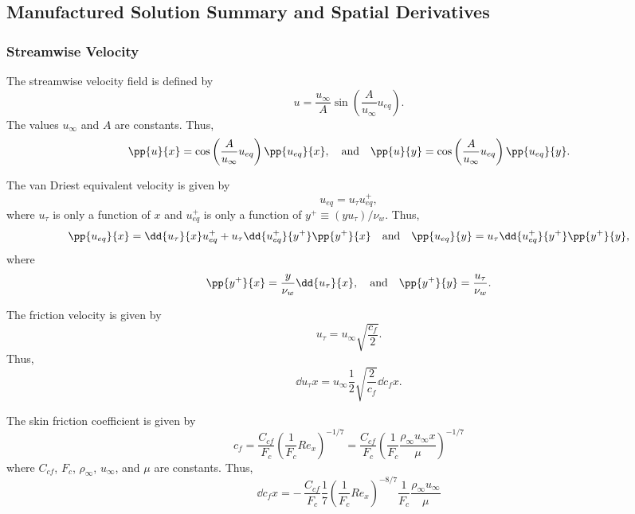 \subsection{Manufactured Solution Summary and Spatial Derivatives} \label{sec:summary_and_derivatives}

\subsubsection{Streamwise Velocity}
The streamwise velocity field is defined by
%
\begin{equation*}
u = \frac{u_{\infty}}{A} \sin \left( \frac{A}{u_{\infty}} u_{eq} \right).
\end{equation*}
%
The values $u_{\infty}$ and $A$ are constants.  Thus,
%
\begin{gather*}
\pp{u}{x} = \cos \left(\frac{A}{u_{\infty}} u_{eq} \right) \pp{u_{eq}}{x}, \quad \text{and} \quad
\pp{u}{y} = \cos \left(\frac{A}{u_{\infty}} u_{eq} \right) \pp{u_{eq}}{y}.
\end{gather*}
%

The van Driest equivalent velocity is given by
%
\begin{equation*}
u_{eq} = u_{\tau} u_{eq}^+,
\end{equation*}
% 
where $u_{\tau}$ is only a function of $x$ and $u_{eq}^+$ is only a
function of $y^+ \equiv (y u_{\tau})/\nu_w$.  Thus,
%
\begin{gather*}
\pp{u_{eq}}{x} = \dd{u_{\tau}}{x} u_{eq}^+ + u_{\tau} \dd{u_{eq}^+}{y^+} \pp{y^+}{x} \quad \text{and} \quad
\pp{u_{eq}}{y} =  u_{\tau} \dd{u_{eq}^+}{y^+} \pp{y^+}{y},
\end{gather*}
%
where
%
\begin{gather*}
\pp{y^+}{x} = \frac{y}{\nu_w} \dd{u_{\tau}}{x}, \quad \text{and} \quad
\pp{y^+}{y} = \frac{u_{\tau}}{\nu_w}.
\end{gather*}
%

The friction velocity is given by
%
\begin{equation*}
u_{\tau} = u_{\infty} \sqrt{\frac{c_f}{2}}.
\end{equation*}
%
Thus,
%
\begin{equation*}
\dd{u_{\tau}}{x} = u_{\infty}  \frac{1}{2} \sqrt{ \frac{2}{c_f} } \dd{c_f}{x}.
\end{equation*}
%

The skin friction coefficient is given by
%
\begin{equation*}
c_f = \frac{C_{cf}}{F_c} \left( \frac{1}{F_c} Re_x \right)^{-1/7} = \frac{C_{cf}}{F_c} \left( \frac{1}{F_c} \frac{\rho_{\infty} u_{\infty} x}{\mu} \right)^{-1/7}
\end{equation*}
%
where $C_{cf}$, $F_c$, $\rho_{\infty}$, $u_{\infty}$, and $\mu$ are constants.  Thus,
%
\begin{equation*}
\dd{c_f}{x} = - \, \frac{C_{cf}}{F_c} \frac{1}{7} \left( \frac{1}{F_c} Re_x \right)^{-8/7} \frac{1}{F_c} \frac{\rho_{\infty} u_{\infty}}{\mu}
\end{equation*}

